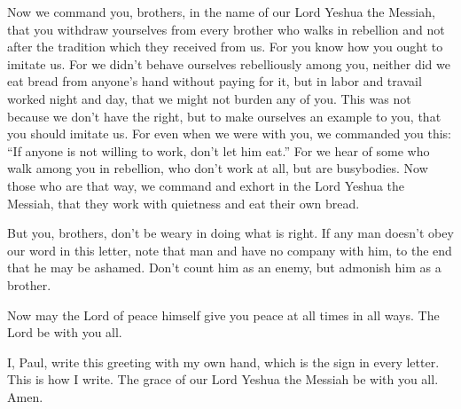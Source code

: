 \myverse{}Now we command you, brothers, in the name of our Lord Yeshua the Messiah, that you withdraw yourselves from every brother who walks in rebellion and not after the tradition which they received from us. \myverse{}For you know how you ought to imitate us. For we didn’t behave ourselves rebelliously among you, \myverse{}neither did we eat bread from anyone’s hand without paying for it, but in labor and travail worked night and day, that we might not burden any of you. \myverse{}This was not because we don’t have the right, but to make ourselves an example to you, that you should imitate us. \myverse{}For even when we were with you, we commanded you this: “If anyone is not willing to work, don’t let him eat.” \myverse{}For we hear of some who walk among you in rebellion, who don’t work at all, but are busybodies. \myverse{}Now those who are that way, we command and exhort in the Lord Yeshua the Messiah, that they work with quietness and eat their own bread.


\myverse{}But you, brothers, don’t be weary in doing what is right. \myverse{}If any man doesn’t obey our word in this letter, note that man and have no company with him, to the end that he may be ashamed. \myverse{}Don’t count him as an enemy, but admonish him as a brother.


\myverse{}Now may the Lord of peace himself give you peace at all times in all ways. The Lord be with you all.


\myverse{}I, Paul, write this greeting with my own hand, which is the sign in every letter. This is how I write. \myverse{}The grace of our Lord Yeshua the Messiah be with you all. Amen.


